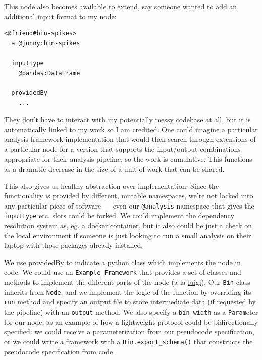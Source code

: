\documentclass[notoc]{tufte-book}
\begin{document}
This node also becomes available to extend, say someone wanted to add an
additional input format to my node:

\begin{verbatim}
<@friend#bin-spikes>
  a @jonny:bin-spikes

  inputType
    @pandas:DataFrame

  providedBy
    ...
\end{verbatim}

They don't have to interact with my potentially messy codebase at all,
but it is automatically linked to my work so I am credited. One could
imagine a particular analysis framework implementation that would then
search through extensions of a particular node for a version that
supports the input/output combinations appropriate for their analysis
pipeline, so the work is cumulative. This functions as a dramatic
decrease in the size of a unit of work that can be shared.

This also gives us healthy abstraction over implementation. Since the
functionality is provided by different, mutable namespaces, we're not
locked into any particular piece of software --- even our
\texttt{@analysis} namespace that gives the \texttt{inputType} etc.
slots could be forked. We could implement the dependency resolution
system as, eg. a docker container, but it also could be just a check on
the local environment if someone is just looking to run a small analysis
on their laptop with those packages already installed.

We use providedBy to indicate a python class which implements the node
in code. We could use an \texttt{Example\_Framework} that provides a set
of classes and methods to implement the different parts of the node (a
la \href{https://luigi.readthedocs.io/en/stable/tasks.html}{luigi}). Our
\texttt{Bin} class inherits from \texttt{Node}, and we implement the
logic of the function by overriding its \texttt{run} method and specify
an output file to store intermediate data (if requested by the pipeline)
with an \texttt{output} method. We also specify a \texttt{bin\_width} as
a \texttt{Param}eter for our node, as an example of how a lightweight
protocol could be bidirectionally specified: we could receive a
parameterization from our pseudocode specification, or we could write a
framework with a \texttt{Bin.export\_schema()} that constructs the
pseudocode specification from code.
\end{document}
